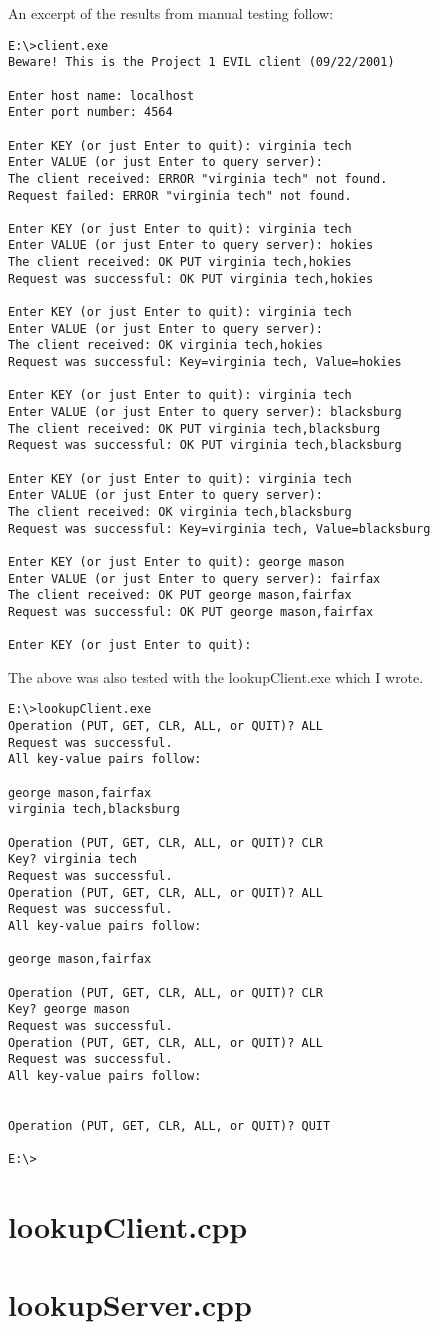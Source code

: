 \documentclass[11pt]{report}
\begin{document}
An excerpt of the results from manual testing follow:

\begin{verbatim}
E:\>client.exe
Beware! This is the Project 1 EVIL client (09/22/2001)

Enter host name: localhost
Enter port number: 4564

Enter KEY (or just Enter to quit): virginia tech
Enter VALUE (or just Enter to query server):
The client received: ERROR "virginia tech" not found.
Request failed: ERROR "virginia tech" not found.

Enter KEY (or just Enter to quit): virginia tech
Enter VALUE (or just Enter to query server): hokies
The client received: OK PUT virginia tech,hokies
Request was successful: OK PUT virginia tech,hokies

Enter KEY (or just Enter to quit): virginia tech
Enter VALUE (or just Enter to query server):
The client received: OK virginia tech,hokies
Request was successful: Key=virginia tech, Value=hokies

Enter KEY (or just Enter to quit): virginia tech
Enter VALUE (or just Enter to query server): blacksburg
The client received: OK PUT virginia tech,blacksburg
Request was successful: OK PUT virginia tech,blacksburg

Enter KEY (or just Enter to quit): virginia tech
Enter VALUE (or just Enter to query server):
The client received: OK virginia tech,blacksburg
Request was successful: Key=virginia tech, Value=blacksburg

Enter KEY (or just Enter to quit): george mason
Enter VALUE (or just Enter to query server): fairfax
The client received: OK PUT george mason,fairfax
Request was successful: OK PUT george mason,fairfax

Enter KEY (or just Enter to quit):
\end{verbatim}

The above was also tested with the lookupClient.exe which I wrote.

\begin{verbatim}
E:\>lookupClient.exe
Operation (PUT, GET, CLR, ALL, or QUIT)? ALL
Request was successful.
All key-value pairs follow:

george mason,fairfax
virginia tech,blacksburg

Operation (PUT, GET, CLR, ALL, or QUIT)? CLR
Key? virginia tech
Request was successful.
Operation (PUT, GET, CLR, ALL, or QUIT)? ALL
Request was successful.
All key-value pairs follow:

george mason,fairfax

Operation (PUT, GET, CLR, ALL, or QUIT)? CLR
Key? george mason
Request was successful.
Operation (PUT, GET, CLR, ALL, or QUIT)? ALL
Request was successful.
All key-value pairs follow:


Operation (PUT, GET, CLR, ALL, or QUIT)? QUIT

E:\>
\end{verbatim}

\appendix

\chapter{lookupClient.cpp}


\chapter{lookupServer.cpp}

\end{document}
